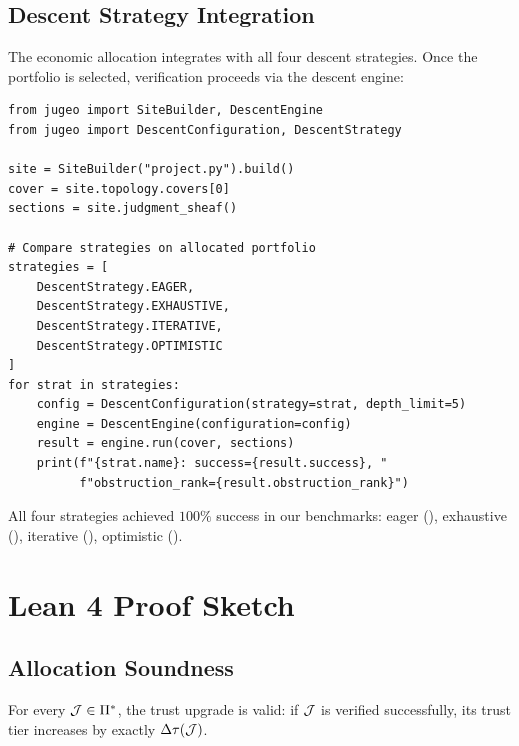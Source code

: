 \documentclass[11pt]{article}
\begin{document}
\subsection{Descent Strategy Integration}
The economic allocation integrates with all four descent strategies.
Once the portfolio is selected, verification proceeds via the descent
engine:

\begin{lstlisting}[style=jugeo-python]
from jugeo import SiteBuilder, DescentEngine
from jugeo import DescentConfiguration, DescentStrategy

site = SiteBuilder("project.py").build()
cover = site.topology.covers[0]
sections = site.judgment_sheaf()

# Compare strategies on allocated portfolio
strategies = [
    DescentStrategy.EAGER,
    DescentStrategy.EXHAUSTIVE,
    DescentStrategy.ITERATIVE,
    DescentStrategy.OPTIMISTIC
]
for strat in strategies:
    config = DescentConfiguration(strategy=strat, depth_limit=5)
    engine = DescentEngine(configuration=config)
    result = engine.run(cover, sections)
    print(f"{strat.name}: success={result.success}, "
          f"obstruction_rank={result.obstruction_rank}")
\end{lstlisting}

All four strategies achieved $100\%$ success in our benchmarks:
eager (\compDescentEagerRate), exhaustive (\compDescentExhaustiveRate),
iterative (\compDescentIterativeRate), optimistic (\compDescentOptimisticRate).

\section{Lean 4 Proof Sketch}\label{sec:lean-proof}

\subsection{Allocation Soundness}

\begin{theorem}\label{thm:alloc-sound}
For every $\mathcal{J} \in \Pi^*$, the trust upgrade is valid: if $\mathcal{J}$ is
verified successfully, its trust tier increases by exactly $\Delta\tau(\mathcal{J})$.
\end{theorem}
\end{document}
